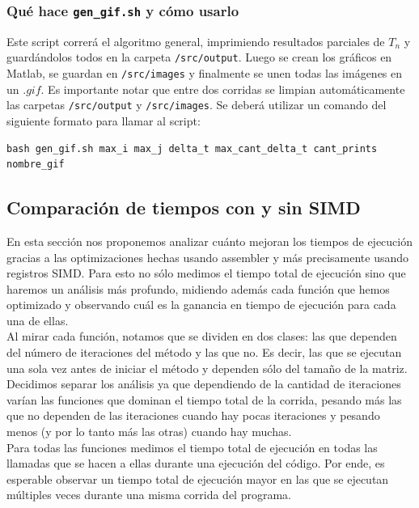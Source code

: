 \documentclass[a4paper]{article}
\begin{document}
\subsubsection{Qué hace \texttt{gen\_gif.sh} y cómo usarlo}
Este script correrá el algoritmo general, imprimiendo resultados parciales
de $T_n$ y guardándolos todos en la carpeta \texttt{/src/output}. Luego
se crean los gráficos en Matlab, se guardan en \texttt{/src/images} y
finalmente se unen todas las imágenes en un $.gif$. Es importante notar
que entre dos corridas se limpian automáticamente las carpetas \texttt{/src/output} y
\texttt{/src/images}.
Se deberá utilizar un comando del siguiente formato para llamar al script:
\begin{center}
\begin{verbatim}
bash gen_gif.sh max_i max_j delta_t max_cant_delta_t cant_prints nombre_gif
\end{verbatim}
\end{center}

\subsection{Comparación de tiempos con y sin SIMD}

En esta sección nos proponemos analizar cuánto mejoran los tiempos de 
ejecución gracias a las optimizaciones hechas usando assembler y más 
precisamente usando registros SIMD. Para esto no sólo medimos el 
tiempo total de ejecución sino que haremos 
un análisis más profundo, midiendo además cada función que hemos 
optimizado y observando cuál es la ganancia en tiempo de ejecución
para cada una de ellas.\\

Al mirar cada función, notamos que se dividen en dos clases: las que 
dependen del número de iteraciones del método y las que no. Es decir, 
las que se ejecutan una sola vez antes de iniciar el método y 
dependen sólo del tamaño de la matriz.\\

Decidimos separar los análisis ya que dependiendo de la cantidad de 
iteraciones varían las funciones que dominan el tiempo total de la 
corrida, pesando más las que no dependen de las iteraciones 
cuando hay pocas iteraciones y pesando menos (y por lo tanto más las otras) 
cuando hay muchas.\\

Para todas las funciones medimos el tiempo total de ejecución en 
todas las llamadas que se hacen a ellas durante una ejecución del 
código. Por ende, es esperable observar un tiempo total de ejecución mayor en las 
que se ejecutan múltiples veces durante una misma corrida del programa.
\end{document}
